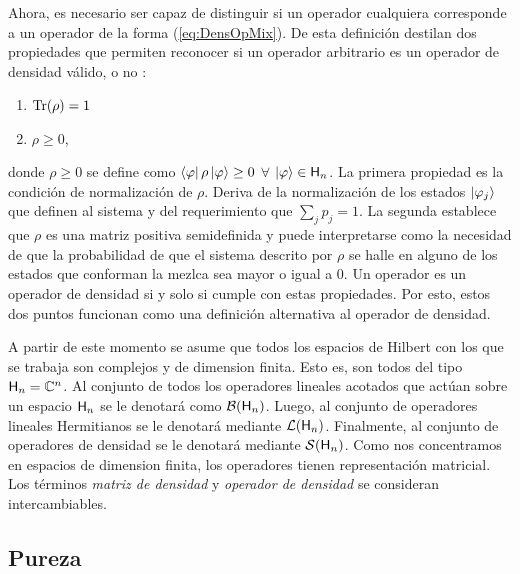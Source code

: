 \fi

Ahora, es necesario ser capaz de distinguir si un operador cualquiera corresponde a un operador de la forma (\ref{eq:DensOpMix}). De esta definición destilan dos propiedades que permiten reconocer si un operador arbitrario es un operador de densidad válido, o no \cite{Holevo}:
\begin{enumerate}
    \item $\Tr(\rho)=1$
    \item $\rho\geq 0$,
\end{enumerate}
donde $\rho\geq 0$ se define como $\bra{\varphi}\rho\ket{\varphi}\geq 0$ $\forall$ $\ket{\varphi}\in{\sf H}_{n}$.
La primera propiedad es la condición de normalización de $\rho$. Deriva de la normalización de los estados $\ket{\varphi_{j}}$ que definen al sistema y del requerimiento que $\sum_{j}p_{j}=1$. La segunda establece que $\rho$ es una matriz positiva semidefinida y puede interpretarse como la necesidad de que la probabilidad de que el sistema descrito por $\rho$ se halle en alguno de los estados que conforman la mezlca sea mayor o igual a $0$. Un operador es un operador de densidad si y solo si cumple con estas propiedades. Por esto, estos dos puntos funcionan como una definición alternativa al operador de densidad.


A partir de este momento se asume que todos los espacios de Hilbert con los que se trabaja son complejos y de dimension finita. Esto es, son todos del tipo ${\sf H}_{n}=\mathbb{C}^{n}$. Al conjunto de todos los operadores lineales acotados que actúan sobre un espacio ${\sf H}_{n}$ se le denotará como $\mathcal{B}({\sf H}_{n})$. Luego, al conjunto de operadores lineales Hermitianos se le denotará mediante $\mathcal{L}({\sf H}_{n})$. Finalmente, al conjunto de operadores de densidad se le denotará mediante $\mathcal{S}({\sf H}_{n})$. Como nos concentramos en espacios de dimension finita, los operadores tienen representación matricial. Los términos \textit{matriz de densidad} y \textit{operador de densidad} se consideran intercambiables.



\subsection{Pureza}

